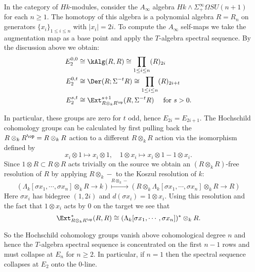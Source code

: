 \documentclass[leqno,oneside,english]{elsarticle}
\begin{document}
\begin{example}\label{ex:su-n}
  In the category of $Hk$-modules, consider the $A_{\infty}$ algebra
  $Hk\wedge \Sigma^{\infty}_+ \Omega SU(n+1)$ for each $n \ge 1$. The
  homotopy of this algebra is a polynomial algebra $R = R_n$ on
  generators $\{x_{i}\}_{1\leq i\leq n}$ with $|x_i|=2i$.  To
  compute the $A_{\infty}$ self-maps we take the augmentation map as a base point and apply the $T$-algebra spectral sequence. By the discussion above we obtain:
  \begin{align*}
   E_2^{0,0} &\cong   \kAlg(R,R)\cong
   \prod_{1\leq i\leq n} (R)_{2i}\\ 
    E_2^{0,t} & \cong  \Der(R;\Sigma^{-t}R)\cong 
   \prod_{1\leq i\leq n} (R)_{2i+t}\\ 
      E_2^{s,t} & \cong  \Ext^{s+1}_{R\otimes_k R^{\op}}(R,\Sigma^{-t}R)
      \quad \text{ for } s>0.
   \end{align*}
   
   In particular, these groups are zero for $t$ odd, hence
   $E_{2i}=E_{2i+1}$.  The Hochschild cohomology groups can be
   calculated by first pulling back the $R\otimes_k R^{\op}=R\otimes_k R$ action to
   a different $R\otimes_k R$ action via the isomorphism defined by
   \[
   x_i \otimes 1 \mapsto x_i\otimes 1, \quad 
   1\otimes x_i \mapsto x_i\otimes 1 - 1\otimes x_i. 
   \]
   Since $1\otimes R\subset R\otimes R$ acts trivially on the source we obtain
   an $(R\otimes_k R)$-free resolution of $R$ by applying $R \otimes_k -$ to
   the Koszul resolution of $k$: 
   \[ 
   \left(\Lambda_k[\sigma x_{1}, \cdots,\sigma x_n]\otimes_k R
   \rightarrow k\right) \stackrel{R\otimes_k -}{\mapsto} \left(R\otimes_k \Lambda_k[\sigma x_{1}, \cdots,\sigma x_n]\otimes_k R
   \rightarrow R \right)   \]
   Here $\sigma x_{i}$ has bidegree $(1,2i)$ and $d(\sigma
   x_i)=1\otimes x_i$. Using this resolution and the fact that $1\otimes x_i$ acts by 0 on the target we see that
   \[ 
      \Ext^{*}_{R\otimes_k R^{\op}}(R,R) \cong (\Lambda_k[\sigma x_{1},
      \cdots,\sigma x_n])^*\otimes_k R.
   \]

   So the Hochschild cohomology groups vanish above
   cohomological degree $n$ and hence the $T$-algebra
   spectral sequence is concentrated on
   the first $n-1$ rows and must collapse at $E_n$ for $n\geq 2$. In
   particular, if $n=1$ then the spectral sequence collapses at $E_2$
   onto the 0-line.


\end{example}
\end{document}
